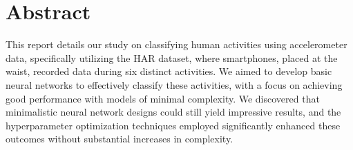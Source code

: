 \section{Abstract}\label{sec:abstract}

This report details our study on classifying human activities using accelerometer data, specifically utilizing the HAR dataset, where smartphones, placed at the waist, recorded data during six distinct activities.
We aimed to develop basic neural networks to effectively classify these activities, with a focus on achieving good performance with models of minimal complexity.
We discovered that minimalistic neural network designs could still yield impressive results, and the hyperparameter optimization techniques employed significantly enhanced these outcomes without substantial increases in complexity.

